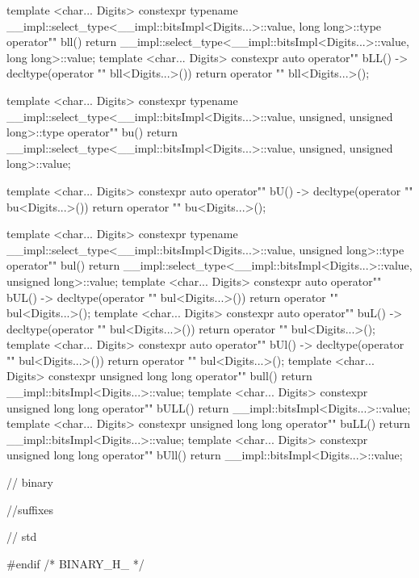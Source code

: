 \documentclass[ebook,11pt,article]{memoir}
\begin{document}
\begin{codeblock}
{{{template <char... Digits>
constexpr typename
__impl::select_type<__impl::bitsImpl<Digits...>::value,
       long long>::type
operator"" bll(){
	return 	__impl::select_type<__impl::bitsImpl<Digits...>::value,
			      long long>::value;
}
template <char... Digits>
constexpr auto
operator"" bLL() -> decltype(operator "" bll<Digits...>()){
	return 	operator "" bll<Digits...>();
}

template <char... Digits>
constexpr typename
__impl::select_type<__impl::bitsImpl<Digits...>::value,
      unsigned, unsigned long>::type
operator"" bu(){
	return 	__impl::select_type<__impl::bitsImpl<Digits...>::value,
			      unsigned, unsigned long>::value;
}

template <char... Digits>
constexpr auto
operator"" bU() -> decltype(operator "" bu<Digits...>()){
	return 	operator "" bu<Digits...>();
}

template <char... Digits>
constexpr typename
__impl::select_type<__impl::bitsImpl<Digits...>::value,
       unsigned long>::type
operator"" bul(){
	return 	__impl::select_type<__impl::bitsImpl<Digits...>::value,
			      unsigned long>::value;
}
template <char... Digits>
constexpr auto
operator"" bUL() -> decltype(operator "" bul<Digits...>()){
	return 	operator "" bul<Digits...>();
}
template <char... Digits>
constexpr auto
operator"" buL() -> decltype(operator "" bul<Digits...>()){
	return 	operator "" bul<Digits...>();
}
template <char... Digits>
constexpr auto
operator"" bUl() -> decltype(operator "" bul<Digits...>()){
	return 	operator "" bul<Digits...>();
}
template <char... Digits>
constexpr unsigned long long
operator"" bull(){
	return __impl::bitsImpl<Digits...>::value;
}
template <char... Digits>
constexpr unsigned long long
operator"" bULL(){
	return __impl::bitsImpl<Digits...>::value;
}
template <char... Digits>
constexpr unsigned long long
operator"" buLL(){
	return __impl::bitsImpl<Digits...>::value;
}
template <char... Digits>
constexpr unsigned long long
operator"" bUll(){
	return __impl::bitsImpl<Digits...>::value;
}


} // binary
} //suffixes
} // std



#endif /* BINARY_H_ */
\end{codeblock}

\end{document}
